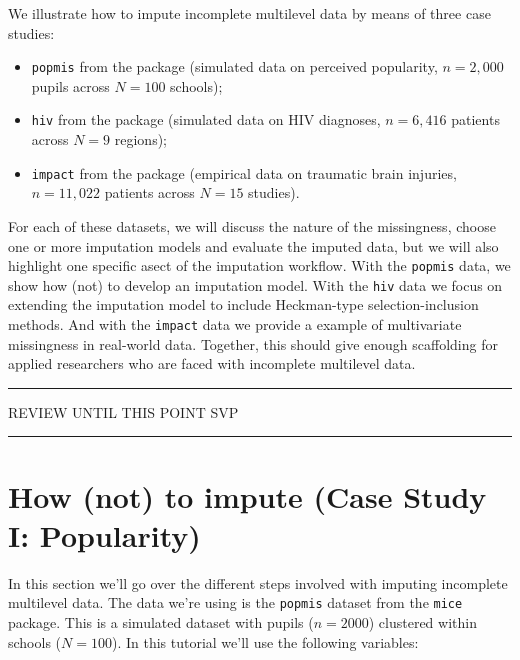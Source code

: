 \documentclass[
]{jss}
\providecommand{\tightlist}{%
  \setlength{\itemsep}{0pt}\setlength{\parskip}{0pt}}
\begin{document}
We illustrate how to impute incomplete multilevel data by means of three
case studies:

\begin{itemize}
\tightlist
\item
  \texttt{popmis} from the  package (simulated data on
  perceived popularity, \(n = 2,000\) pupils across \(N = 100\)
  schools);
\item
  \texttt{hiv} from the  package (simulated data on HIV
  diagnoses, \(n = 6,416\) patients across \(N = 9\) regions);
\item
  \texttt{impact} from the  package (empirical data on
  traumatic brain injuries, \(n = 11,022\) patients across \(N = 15\)
  studies).
\end{itemize}

For each of these datasets, we will discuss the nature of the
missingness, choose one or more imputation models and evaluate the
imputed data, but we will also highlight one specific asect of the
imputation workflow. With the \texttt{popmis} data, we show how (not) to
develop an imputation model. With the \texttt{hiv} data we focus on
extending the imputation model to include Heckman-type
selection-inclusion methods. And with the \texttt{impact} data we
provide a example of multivariate missingness in real-world data.
Together, this should give enough scaffolding for applied researchers
who are faced with incomplete multilevel data.

\begin{center}\rule{0.5\linewidth}{0.5pt}\end{center}

\begin{center}
REVIEW UNTIL THIS POINT SVP
\end{center}

\begin{center}\rule{0.5\linewidth}{0.5pt}\end{center}

\hypertarget{how-not-to-impute-case-study-i-popularity}{%
\section{How (not) to impute (Case Study I:
Popularity)}\label{how-not-to-impute-case-study-i-popularity}}

In this section we'll go over the different steps involved with imputing
incomplete multilevel data. The data we're using is the \texttt{popmis}
dataset from the \texttt{mice} package. This is a simulated dataset with
pupils (\(n = 2000\)) clustered within schools (\(N = 100\)). In this
tutorial we'll use the following variables:
\end{document}
